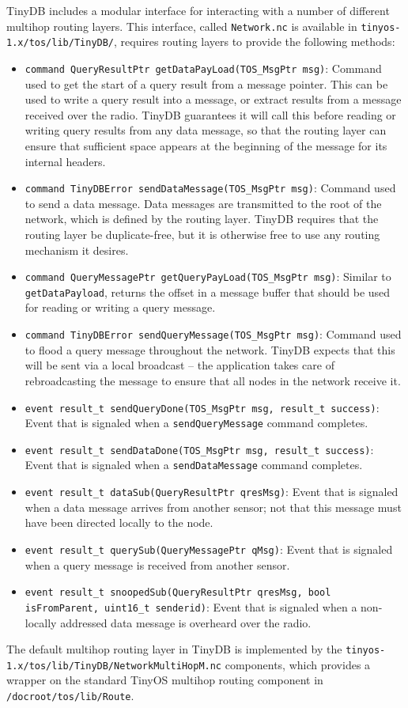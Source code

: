 \documentclass[11pt]{article}
\newcommand{\docroot}{tinyos-1.x}
\begin{document}
TinyDB includes a modular interface for interacting with a number of different
multihop routing layers.  This interface, called {\tt Network.nc} is 
available in {\tt \docroot/tos/lib/TinyDB/}, requires routing layers
to provide the following methods:
\begin{itemize}
\item {\tt command QueryResultPtr getDataPayLoad(TOS\_MsgPtr msg)}:  Command used to get the start of
a query result from a message pointer.  This can be used to write a query result into a message,
or extract results from a message received over the radio.  TinyDB guarantees it will call this before
reading or writing query results from any data message, so that the routing layer can ensure that
sufficient space appears at the beginning of the message for its internal headers.
\item {\tt command TinyDBError sendDataMessage(TOS\_MsgPtr msg)}:  Command used to send a data message.
Data messages are transmitted to the root of the network, which is defined by the routing layer.
TinyDB requires that the routing layer be duplicate-free, but it is otherwise free to use any
routing mechanism it desires.
\item {\tt command QueryMessagePtr getQueryPayLoad(TOS\_MsgPtr msg)}: Similar to {\tt getDataPayload},
returns the offset in a message buffer that should be used for reading or writing a query message.
\item {\tt command TinyDBError sendQueryMessage(TOS\_MsgPtr msg)}:  Command used to flood a query
message throughout the network.  TinyDB expects that this will be sent via a local broadcast -- 
the application takes care of rebroadcasting the message to ensure that all nodes in the network
receive it.
\item {\tt event result\_t sendQueryDone(TOS\_MsgPtr msg, result\_t success)}:  Event that is signaled
when a {\tt sendQueryMessage} command completes.
\item {\tt event result\_t sendDataDone(TOS\_MsgPtr msg, result\_t success)}:  Event that is signaled
when a {\tt sendDataMessage} command completes.
\item {\tt event result\_t dataSub(QueryResultPtr qresMsg)}:  Event that is signaled when a data message
arrives from another sensor; not that this message must have been directed locally to the node.
\item {\tt event result\_t querySub(QueryMessagePtr qMsg)}:  Event that is signaled when a query 
message is received from another sensor.
\item {\tt event result\_t snoopedSub(QueryResultPtr qresMsg, bool isFromParent, uint16\_t senderid)}:
Event that is signaled when a non-locally addressed data message is overheard over the radio.  
\end{itemize}
The default multihop routing layer in TinyDB is implemented by the 
{\tt \docroot/tos/lib/TinyDB/NetworkMultiHopM.nc} components, which provides
a wrapper on the standard TinyOS multihop routing component in {\tt /docroot/tos/lib/Route}.
\end{document}
